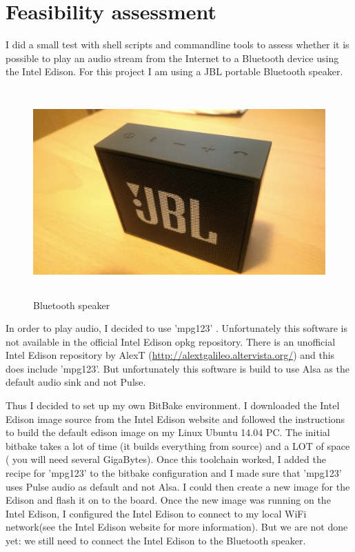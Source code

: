 \documentclass[12pt,a4paper]{scrreprt}
\begin{document}
\section{Feasibility assessment}

I did a small test with shell scripts and commandline tools to assess whether it is possible to play an audio stream from the Internet to a Bluetooth device using the  Intel Edison.
For this project I am using a JBL portable Bluetooth speaker.

\begin{figure}[h]
	\includegraphics[height=300px]{images/speaker}
	\caption{Bluetooth speaker}
\end{figure}

In order to play  audio, I decided to use 'mpg123' . Unfortunately this software is not available in the official Intel Edison opkg repository. There is an unofficial Intel Edison repository by AlexT (\url{http://alextgalileo.altervista.org/}) and this does include 'mpg123'. But unfortunately this software is build to use Alsa as the default audio sink and not Pulse. 

Thus I decided to set up my own BitBake environment. 
I downloaded the Intel Edison image source from the Intel Edison website and followed the instructions to build the default edison image on my Linux Ubuntu 14.04 PC. 
The initial bitbake takes a lot of time (it builds everything from source) and a LOT of space ( you will need several GigaBytes). 
Once this toolchain worked, I added the recipe for 'mpg123' to the bitbake configuration and I made sure that 'mpg123' uses Pulse audio as default and not Alsa. I could then create a new image for the Edison and flash it on to the board. Once the new image was running on the Intel Edison, I configured the Intel Edison to connect to my local WiFi network(see the Intel Edison website for more information). But we are not done yet: we still need to connect the Intel Edison to the Bluetooth speaker.
\end{document}
